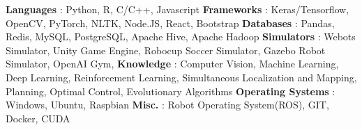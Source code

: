 \begin{cventries}  
\skillentry
    {
    \space \textbf{Languages} : Python, R, C/C++, Javascript
    \space \textbf{Frameworks} : Keras/Tensorflow, OpenCV, PyTorch, NLTK, Node.JS, React, Bootstrap
    \space \textbf{Databases} : Pandas, Redis, MySQL, PostgreSQL, Apache Hive, Apache Hadoop
    \space \textbf{Simulators} : Webots Simulator, Unity Game Engine, Robocup Soccer Simulator, Gazebo Robot Simulator, OpenAI Gym,
    \space \textbf{Knowledge} : Computer Vision, Machine Learning, Deep Learning, Reinforcement Learning, Simultaneous Localization and Mapping, Planning, Optimal Control, Evolutionary Algorithms
    \space \textbf{Operating Systems} : Windows, Ubuntu, Raspbian 
    \space \textbf{Misc.} : Robot Operating System(ROS), GIT, Docker, CUDA
    }
    

\end{cventries}
\vspace{0.5 cm}
